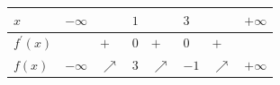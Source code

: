 \documentclass[border=.4pt]{standalone}
\begin{document}
\color{ink}\begin{tabular}{|>{\centering\arraybackslash}m{1.7cm}|>{\centering\arraybackslash}m{1.25cm}|>{\centering\arraybackslash}m{1.25cm}|>{\centering\arraybackslash}m{1.25cm}|>{\centering\arraybackslash}m{1.25cm}|>{\centering\arraybackslash}m{1.25cm}|>{\centering\arraybackslash}m{1.25cm}|>{\centering\arraybackslash}m{1.25cm}|}\hline
\cellcolor{head}$x$ & \cellcolor{head}$-\infty$ & \cellcolor{head} & \cellcolor{head}$1$ & \cellcolor{head} & \cellcolor{head}$3$ & \cellcolor{head} & \cellcolor{head}$+\infty$ \\ \hline
\cellcolor{head}$f^{\prime}(x)$ &  & $+$ & $0$ & $+$ & $0$ & $+$ &  \\ \hline
\cellcolor{head}$f(x)$ & $-\infty$ & \color{focus}\large $\nearrow$ & $3$ & \color{focus}\large $\nearrow$ & $-1$ & \color{focus}\large $\nearrow$ & $+\infty$ \\ \hline\end{tabular}
\end{document}
